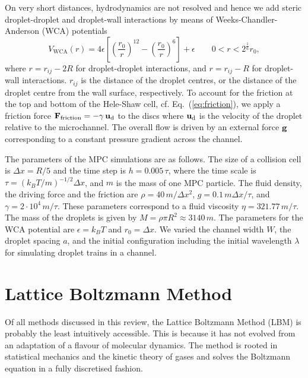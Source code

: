 \documentclass[8.5pt,twoside,twocolumn]{article}
\renewcommand{\vec}[1]{{\ensuremath{\mathchoice
                     {\mbox{\boldmath$\displaystyle\mathbf{#1}$}}
                     {\mbox{\boldmath$\textstyle\mathbf{#1}$}}
                     {\mbox{\boldmath$\scriptstyle\mathbf{#1}$}}
                     {\mbox{\boldmath$\scriptscriptstyle\mathbf{#1}$}}}}}%
\begin{document}
On very short distances, hydrodynamics are not resolved and hence we
add steric droplet-droplet and droplet-wall interactions by means of
Weeks-Chandler-Anderson (WCA) potentials
%
\begin{equation}
V_\text{WCA}(r) =
4\epsilon \left[ \left( \frac{r_0}{r} \right)^{12} - \left(
\frac{r_0}{r} \right)^6 \right] + \epsilon \qquad 0 < r < 2^{\frac{1}{6}} r_0 ,
\end{equation}
%
where $r = r_{ij} - 2R$ for droplet-droplet interactions, and $r =
r_{ij} - R$ for droplet-wall interactions. $r_{ij}$ is the distance of
the droplet centres, or the distance of the droplet centre from the
wall surface, respectively. To account for the friction at the top and
bottom of the Hele-Shaw cell, cf. Eq.~(\ref{eq:friction}), we apply a
friction force $\vec{F}_\text{friction} = -\gamma \, \vec{u}_\text{d}$ to
the discs where $\vec{u}_\text{d}$ is the velocity of the droplet
relative to the microchannel. The overall flow is driven by an
external force $\vec{g}$ corresponding to a constant pressure gradient
across the channel.

The parameters of the MPC simulations are as follows. The size of a
collision cell is $\Delta x=R/5$ and the time step is $h =
0.005\,\tau$, where the time scale is $\tau=(k_BT/m)^{-1/2} \Delta x$,
and $m$ is the mass of one MPC particle. The fluid density, the
driving force and the friction are $\rho=40\,m/\Delta x^2$, $g=0.1\,m
\Delta x/\tau$, and $\gamma=2 \cdot 10^4\,m/\tau$. These parameters
correspond to a fluid viscosity $\eta=321.77\,m/\tau$. The mass of the
droplets is given by $M=\rho\pi R^2\approx3140\,m$. The parameters for
the WCA potential are $\epsilon=k_BT$ and $r_0=\Delta x$. We varied
the channel width $W$, the droplet spacing $a$, and the initial
configuration including the initial wavelength $\lambda$ for
simulating droplet trains in a channel.

\clearpage


\section{Lattice Boltzmann Method}

Of all methods discussed in this review, the Lattice Boltzmann Method (LBM) \cite{Succi:2001, Guo:2013} 
is probably the least intuitively accessible. 
This is because it has not evolved from an adaptation of a flavour of molecular dynamics. 
The method is rooted in statistical mechanics and the kinetic theory of gases and solves the Boltzmann equation
in a fully discretised fashion.
\end{document}
